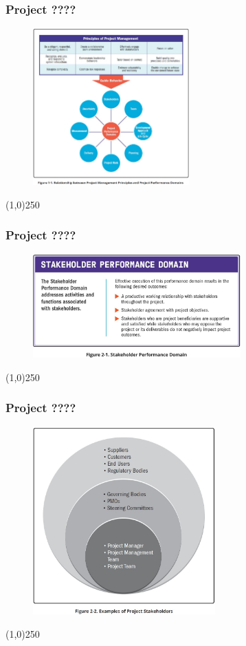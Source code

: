 \begin{frame}
\frametitle{Project ????}
 \begin{figure}
 	\centering
 		\includegraphics[width = 6cm]{../images/guide/Fig1-1.jpg}
 	\label{guidefig:1-1}
 \end{figure}
\end{frame}
\begin{center}\line(1,0){250}\end{center}





\begin{frame}
\frametitle{Project ????}
 \begin{figure}
    \centering
        \includegraphics[width = 8cm]{../images/guide/Fig2-1.jpg}
    \label{guidefig:2-1}
 \end{figure}
\end{frame}
\begin{center}\line(1,0){250}\end{center}


\begin{frame}
\frametitle{Project ????}
 \begin{figure}
    \centering
        \includegraphics[width = 7cm]{../images/guide/Fig2-2.jpg}
    \label{guidefig:2-2}
 \end{figure}
\end{frame}
\begin{center}\line(1,0){250}\end{center}

